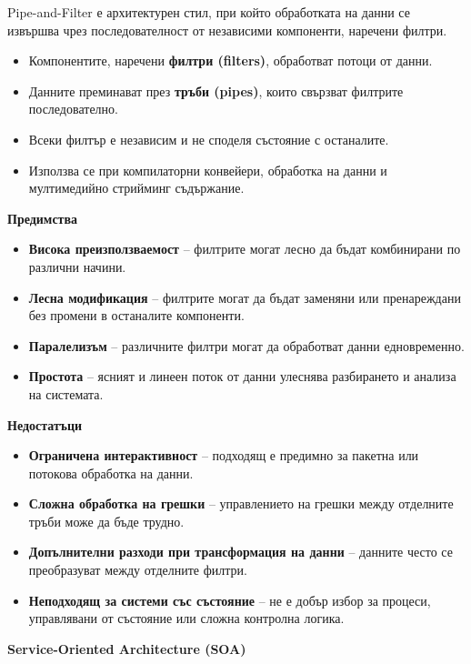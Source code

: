 \documentclass{article}
\renewcommand{\\}{\newline}
\begin{document}
Pipe-and-Filter е архитектурен стил, при който обработката на данни се извършва чрез последователност от независими компоненти, наречени филтри.

\begin{itemize}
    \item Компонентите, наречени \textbf{филтри (filters)}, обработват потоци от данни.
    \item Данните преминават през \textbf{тръби (pipes)}, които свързват филтрите последователно.
    \item Всеки филтър е независим и не споделя състояние с останалите.
    \item Използва се при компилаторни конвейери, обработка на данни и мултимедийно стрийминг съдържание.
\end{itemize}

\textbf{Предимства}

\begin{itemize}
    \item \textbf{Висока преизползваемост} – филтрите могат лесно да бъдат комбинирани по различни начини.
    \item \textbf{Лесна модификация} – филтрите могат да бъдат заменяни или пренареждани без промени в останалите компоненти.
    \item \textbf{Паралелизъм} – различните филтри могат да обработват данни едновременно.
    \item \textbf{Простота} – ясният и линеен поток от данни улеснява разбирането и анализа на системата.
\end{itemize}

\textbf{Недостатъци}

\begin{itemize}
    \item \textbf{Ограничена интерактивност} – подходящ е предимно за пакетна или потокова обработка на данни.
    \item \textbf{Сложна обработка на грешки} – управлението на грешки между отделните тръби може да бъде трудно.
    \item \textbf{Допълнителни разходи при трансформация на данни} – данните често се преобразуват между отделните филтри.
    \item \textbf{Неподходящ за системи със състояние} – не е добър избор за процеси, управлявани от състояние или сложна контролна логика.
\end{itemize}

\textbf{Service-Oriented Architecture (SOA)}
\end{document}
